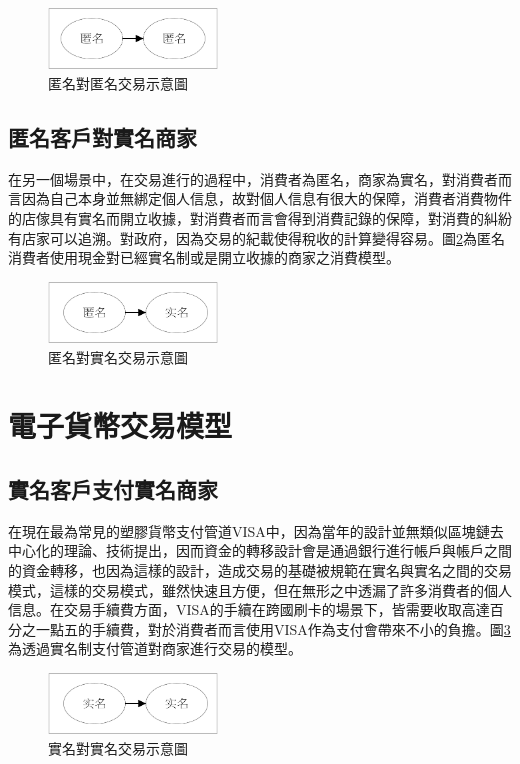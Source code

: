 		\begin{figure}[h]
			\centering
			\includegraphics[width = 0.4\textwidth]{modeaa.png}
			\caption{匿名對匿名交易示意圖}\label{modeaa}
		\end{figure}

		\subsection{匿名客戶對實名商家}
		在另一個場景中，在交易進行的過程中，消費者為匿名，商家為實名，對消費者而言因為自己本身並無綁定個人信息，故對個人信息有很大的保障，消費者消費物件的店傢具有實名而開立收據，對消費者而言會得到消費記錄的保障，對消費的糾紛有店家可以追溯。對政府，因為交易的紀載使得稅收的計算變得容易。圖\ref{modean}為匿名消費者使用現金對已經實名制或是開立收據的商家之消費模型。

		\begin{figure}[h]
			\centering
			\includegraphics[width = 0.4\textwidth]{modean.png}
			\caption{匿名對實名交易示意圖}\label{modean}
		\end{figure}

	\section{電子貨幣交易模型}

		\subsection{實名客戶支付實名商家}
		在現在最為常見的塑膠貨幣支付管道VISA中，因為當年的設計並無類似區塊鏈去中心化的理論、技術提出，因而資金的轉移設計會是通過銀行進行帳戶與帳戶之間的資金轉移，也因為這樣的設計，造成交易的基礎被規範在實名與實名之間的交易模式，這樣的交易模式，雖然快速且方便，但在無形之中透漏了許多消費者的個人信息。在交易手續費方面，VISA的手續在跨國刷卡的場景下，皆需要收取高達百分之一點五的手續費，對於消費者而言使用VISA作為支付會帶來不小的負擔。圖\ref{modenn}為透過實名制支付管道對商家進行交易的模型。

		\begin{figure}[h]
			\centering
			\includegraphics[width = 0.4\textwidth]{modenn.png}
			\caption{實名對實名交易示意圖}\label{modenn}
		\end{figure}

